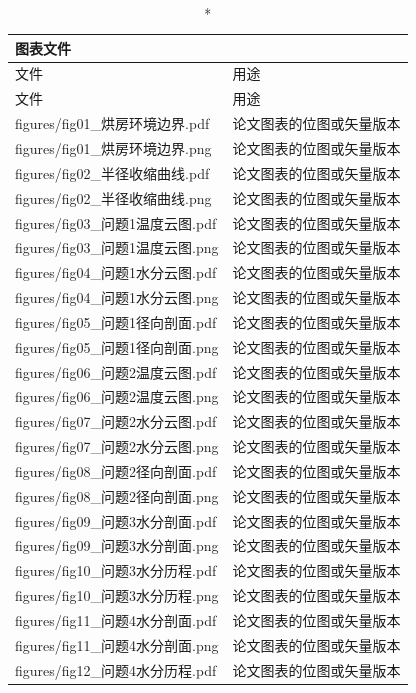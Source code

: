\begin{longtable}{p{}p{}}
\caption*{图表文件}\\
\toprule 文件 & 用途\\
\midrule\endfirsthead
\toprule 文件 & 用途\\
\midrule\endhead
figures/fig01\_烘房环境边界.pdf & 论文图表的位图或矢量版本\\
figures/fig01\_烘房环境边界.png & 论文图表的位图或矢量版本\\
figures/fig02\_半径收缩曲线.pdf & 论文图表的位图或矢量版本\\
figures/fig02\_半径收缩曲线.png & 论文图表的位图或矢量版本\\
figures/fig03\_问题1温度云图.pdf & 论文图表的位图或矢量版本\\
figures/fig03\_问题1温度云图.png & 论文图表的位图或矢量版本\\
figures/fig04\_问题1水分云图.pdf & 论文图表的位图或矢量版本\\
figures/fig04\_问题1水分云图.png & 论文图表的位图或矢量版本\\
figures/fig05\_问题1径向剖面.pdf & 论文图表的位图或矢量版本\\
figures/fig05\_问题1径向剖面.png & 论文图表的位图或矢量版本\\
figures/fig06\_问题2温度云图.pdf & 论文图表的位图或矢量版本\\
figures/fig06\_问题2温度云图.png & 论文图表的位图或矢量版本\\
figures/fig07\_问题2水分云图.pdf & 论文图表的位图或矢量版本\\
figures/fig07\_问题2水分云图.png & 论文图表的位图或矢量版本\\
figures/fig08\_问题2径向剖面.pdf & 论文图表的位图或矢量版本\\
figures/fig08\_问题2径向剖面.png & 论文图表的位图或矢量版本\\
figures/fig09\_问题3水分剖面.pdf & 论文图表的位图或矢量版本\\
figures/fig09\_问题3水分剖面.png & 论文图表的位图或矢量版本\\
figures/fig10\_问题3水分历程.pdf & 论文图表的位图或矢量版本\\
figures/fig10\_问题3水分历程.png & 论文图表的位图或矢量版本\\
figures/fig11\_问题4水分剖面.pdf & 论文图表的位图或矢量版本\\
figures/fig11\_问题4水分剖面.png & 论文图表的位图或矢量版本\\
figures/fig12\_问题4水分历程.pdf & 论文图表的位图或矢量版本\\

\end{longtable}
